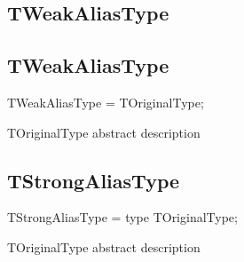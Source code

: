 \documentclass{report}
\newif\ifpdf
\begin{document}
\subsection*{\large{\textbf{TWeakAliasType}}\normalsize\hspace{1ex}\hrulefill}
\else
\subsection*{TWeakAliasType}
\fi
\label{ok_type_aliases-TWeakAliasType}
\begin{list}{}{
\setlength{\itemindent}{0cm}
\setlength{\listparindent}{0cm}
\setlength{\leftmargin}{\evensidemargin}
\addtolength{\leftmargin}{\tmplength}
\settowidth{\labelsep}{X}
\addtolength{\leftmargin}{\labelsep}
\setlength{\labelwidth}{\tmplength}
}
\item[\textbf{Declaration}\hfill]
\ifpdf
\begin{flushleft}
\fi
\begin{ttfamily}
TWeakAliasType = TOriginalType;\end{ttfamily}

\ifpdf
\end{flushleft}
\fi

\par
\item[\textbf{Description}]
TOriginalType abstract description

\end{list}
\ifpdf
\subsection*{\large{\textbf{TStrongAliasType}}\normalsize\hspace{1ex}\hrulefill}
\else
\subsection*{TStrongAliasType}
\fi
\label{ok_type_aliases-TStrongAliasType}
\begin{list}{}{
\setlength{\itemindent}{0cm}
\setlength{\listparindent}{0cm}
\setlength{\leftmargin}{\evensidemargin}
\addtolength{\leftmargin}{\tmplength}
\settowidth{\labelsep}{X}
\addtolength{\leftmargin}{\labelsep}
\setlength{\labelwidth}{\tmplength}
}
\item[\textbf{Declaration}\hfill]
\ifpdf
\begin{flushleft}
\fi
\begin{ttfamily}
TStrongAliasType = type TOriginalType;\end{ttfamily}

\ifpdf
\end{flushleft}
\fi

\par
\item[\textbf{Description}]
TOriginalType abstract description

\end{list}
\ifpdf
\end{document}
